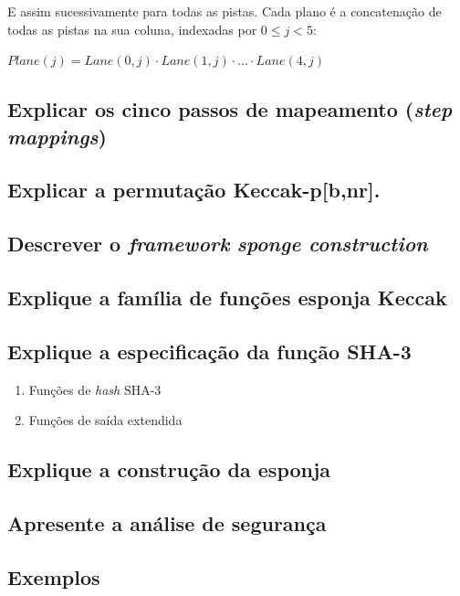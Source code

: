 E assim sucessivamente para todas as pistas. Cada plano é a concatenação de
todas as pistas na sua coluna, indexadas por $0 \leq j < 5$:

$Plane(j) = Lane(0, j) \cdot Lane(1, j) \cdot \ldots \cdot Lane(4, j)$

\subsection{Explicar os cinco passos de mapeamento (\textit{step mappings})}

\subsection{Explicar a permutação Keccak-p[b,nr].}

\subsection{Descrever o \textit{framework} \textit{sponge construction}}

\subsection{Explique a família de funções esponja Keccak}

\subsection{Explique a especificação da função SHA-3}

\begin{enumerate}[label=\roman*.]
    \item Funções de \textit{hash} SHA-3
    \item Funções de saída extendida
\end{enumerate}

\subsection{Explique a construção da esponja}

\subsection{Apresente a análise de segurança}

\subsection{Exemplos}

\let\thesubsection\oldsubsection%
